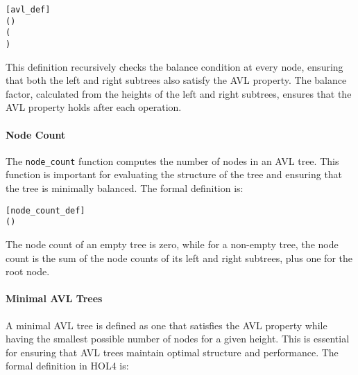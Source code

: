 \documentclass[12pt]{article}
\begin{document}
\begin{alltt}
[avl_def]
  \HOLTokenDefEquality{} 
 (     ) \HOLTokenDefEquality{}
  (  \HOLSymConst{=}   \HOLSymConst{\HOLTokenDisj{}}   \HOLSymConst{=}   \HOLSymConst{\ensuremath{+}}  \HOLSymConst{\HOLTokenDisj{}}
     \HOLSymConst{=}   \HOLSymConst{\ensuremath{+}} ) \HOLSymConst{\HOLTokenConj{}}  \HOLSymConst{=} \HOLSymConst{\&}  \HOLSymConst{\ensuremath{-}} \HOLSymConst{\&}  \HOLSymConst{\HOLTokenConj{}}
    \HOLSymConst{\HOLTokenConj{}}  
\end{alltt}

This definition recursively checks the balance condition at every node, ensuring that both the left and right subtrees also satisfy the AVL property. The balance factor, calculated from the heights of the left and right subtrees, ensures that the AVL property holds after each operation.

\paragraph{Node Count}
The \texttt{node\_count} function computes the number of nodes in an AVL tree. This function is important for evaluating the structure of the tree and ensuring that the tree is minimally balanced. The formal definition is:

\begin{alltt}
[node_count_def]
  \HOLTokenDefEquality{} 
 (     ) \HOLTokenDefEquality{}   \HOLSymConst{\ensuremath{+}}   \HOLSymConst{\ensuremath{+}} 
\end{alltt}

The node count of an empty tree is zero, while for a non-empty tree, the node count is the sum of the node counts of its left and right subtrees, plus one for the root node.

\paragraph{Minimal AVL Trees}
A minimal AVL tree is defined as one that satisfies the AVL property while having the smallest possible number of nodes for a given height. This is essential for ensuring that AVL trees maintain optimal structure and performance. The formal definition in HOL4 is:
\end{document}

